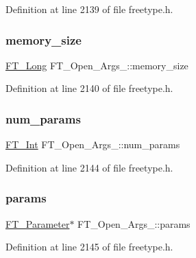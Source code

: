 Definition at line 2139 of file freetype.\+h.

\mbox{\label{struct_f_t___open___args___a87f0bb2f257abe94c93a79e0de3525da}} 
\subsubsection{\texorpdfstring{memory\_size}{memory\_size}}
{\footnotesize\ttfamily \mbox{\hyperlink{fttypes_8h_a7fa72a1f0e79fb1860c5965789024d6f}{F\+T\+\_\+\+Long}} F\+T\+\_\+\+Open\+\_\+\+Args\+\_\+\+::memory\+\_\+size}



Definition at line 2140 of file freetype.\+h.

\mbox{\label{struct_f_t___open___args___afaf47d9e1631f2147b696fd7f5a6f4eb}} 
\subsubsection{\texorpdfstring{num\_params}{num\_params}}
{\footnotesize\ttfamily \mbox{\hyperlink{fttypes_8h_af90e5fb0d07e21be9fe6faa33f02484c}{F\+T\+\_\+\+Int}} F\+T\+\_\+\+Open\+\_\+\+Args\+\_\+\+::num\+\_\+params}



Definition at line 2144 of file freetype.\+h.

\mbox{\label{struct_f_t___open___args___a77b279a34beba29bc14901926f79818f}} 
\subsubsection{\texorpdfstring{params}{params}}
{\footnotesize\ttfamily \mbox{\hyperlink{freetype_8h_a0b96ed5cf9b897c90409981c43633d55}{F\+T\+\_\+\+Parameter}}$\ast$ F\+T\+\_\+\+Open\+\_\+\+Args\+\_\+\+::params}



Definition at line 2145 of file freetype.\+h.

\mbox{\label{struct_f_t___open___args___aea3d454d9fd9bb7434aad07e651d027b}} 
